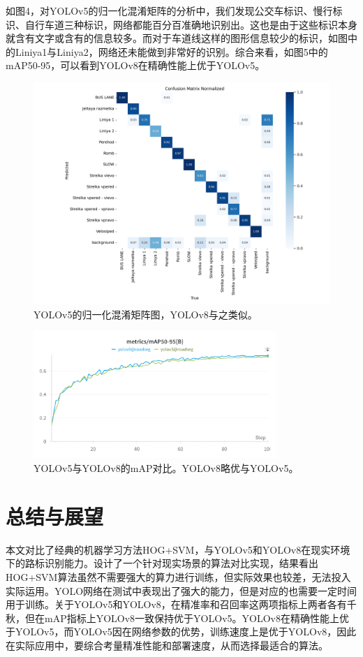 \documentclass{article}
\begin{document}
如图4，对YOLOv5的归一化混淆矩阵的分析中，我们发现公交车标识、慢行标识、自行车道三种标识，网络都能百分百准确地识别出。这也是由于这些标识本身就含有文字或含有的信息较多。而对于车道线这样的图形信息较少的标识，如图中的Liniya1与Liniya2，网络还未能做到非常好的识别。综合来看，如图5中的mAP50-95，可以看到YOLOv8在精确性能上优于YOLOv5。
\begin{figure}[H]
    \centering
    \includegraphics[width=1\textwidth]{YOLOv5/train_yolov5/confusion_matrix_normalized.png}
    \caption{YOLOv5的归一化混淆矩阵图，YOLOv8与之类似。}
    \label{fig:4}
\end{figure}


\begin{figure}[H]
    \centering
    \includegraphics[width=0.82\textwidth]{contrast.png}
    \caption{YOLOv5与YOLOv8的mAP对比。YOLOv8略优与YOLOv5。}
    \label{fig:5}
\end{figure}

\section{总结与展望}
本文对比了经典的机器学习方法HOG+SVM，与YOLOv5和YOLOv8在现实环境下的路标识别能力。设计了一个针对现实场景的算法对比实现，结果看出HOG+SVM算法虽然不需要强大的算力进行训练，但实际效果也较差，无法投入实际运用。YOLO网络在测试中表现出了强大的能力，但是对应的也需要一定时间用于训练。关于YOLOv5和YOLOv8，在精准率和召回率这两项指标上两者各有千秋，但在mAP指标上YOLOv8一致保持优于YOLOv5。YOLOv8在精确性能上优于YOLOv5，而YOLOv5因在网络参数的优势，训练速度上是优于YOLOv8，因此在实际应用中，要综合考量精准性能和部署速度，从而选择最适合的算法。
\end{document}
